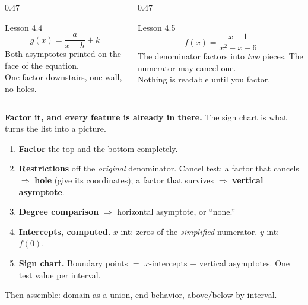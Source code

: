 \documentclass[aspectratio=169, 11pt]{beamer}
\begin{document}
\begin{frame}[t, plain]
  \begin{columns}[T]
    \begin{column}{0.47\textwidth}
      \begin{block}{Lesson 4.4}
        \[ g(x)=\frac{a}{x-h}+k \]
        Both asymptotes printed on the face of the equation. \\[3pt]
        One factor downstairs, one wall, no holes.
      \end{block}
    \end{column}
    \begin{column}{0.47\textwidth}
      \begin{block}{Lesson 4.5}
        \[ f(x)=\frac{x-1}{x^2-x-6} \]
        The denominator factors into \emph{two} pieces. The numerator may cancel one. \\[3pt]
        Nothing is readable until you factor.
      \end{block}
    \end{column}
  \end{columns}
  \vspace{8pt}
  \begin{block}{}
    \centering\textbf{Factor it, and every feature is already in there.} The sign chart is what turns
    the list into a picture.
  \end{block}
\end{frame}

\begin{frame}[t, plain]
  \begin{enumerate}\setlength{\itemsep}{5pt}
    \item \textbf{Factor} the top and the bottom completely.
    \item \textbf{Restrictions} off the \emph{original} denominator. Cancel test: a factor that cancels
          $\Rightarrow$ \textbf{hole} (give its coordinates); a factor that survives $\Rightarrow$
          \textbf{vertical asymptote}.
    \item \textbf{Degree comparison} $\Rightarrow$ horizontal asymptote, or ``none.''
    \item \textbf{Intercepts, computed.} $x$-int: zeros of the \emph{simplified} numerator.
          $y$-int: $f(0)$.
    \item \textbf{Sign chart.} Boundary points $=$ $x$-intercepts $+$ vertical asymptotes. One test
          value per interval.
  \end{enumerate}
  \vspace{4pt}
  {\footnotesize Then assemble: domain as a union, end behavior, above/below by interval.}
\end{frame}
\end{document}
